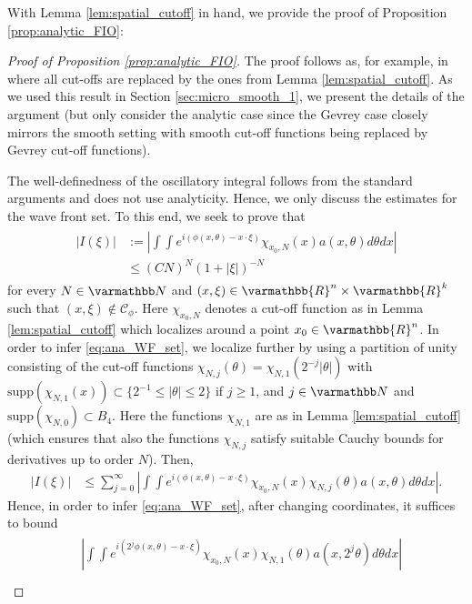 \documentclass[12pt,twoside]{amsart}
\numberwithin{equation}{section}
\renewcommand{\leq}{\leqslant}
\renewcommand{\geq}{\geqslant}
\renewcommand{\mathbb}{\varmathbb}
\newcommand {\R} {\mathbb{R}} \newcommand {\Z} {\mathbb{Z}}
\newcommand{\supp}{\mathrm{supp}}
\begin{document}
\begin{appendix}
With Lemma \ref{lem:spatial_cutoff} in hand, we provide the proof of Proposition \ref{prop:analytic_FIO}:

\begin{proof}[Proof of Proposition \ref{prop:analytic_FIO}]
The proof follows as, for example, in \cite[Theorem 0.5.1]{Sogge} where all cut-offs are replaced by the ones from Lemma \ref{lem:spatial_cutoff}. As we used this result in Section \ref{sec:micro_smooth_1}, we present the details of the argument (but only consider the analytic case since the Gevrey case closely mirrors the smooth setting with smooth cut-off functions being replaced by Gevrey cut-off functions).

The well-definedness of the oscillatory integral follows from the standard arguments and does not use analyticity. Hence, we only discuss the estimates for the wave front set. To this end, we seek to prove that
\begin{align}
\label{eq:ana_WF_set}
\begin{split}
|I(\xi)| 
&:= \left|\int\int e^{i(\phi(x,\theta)- x\cdot \xi)} \chi_{x_0,N}(x) a(x,\theta) d\theta dx \right| \\
&\leq (C N)^N (1+|\xi|)^{-N}
\end{split}
\end{align}
for every $N\in \N$ and $(x,\xi) \in \R^n \times \R^k$ such that $(x,\xi) \notin \mathcal{C}_{\phi}$. Here $\chi_{x_0,N}$ denotes a cut-off function as in Lemma \ref{lem:spatial_cutoff} which localizes around a point $x_0 \in \R^n$. In order to infer \eqref{eq:ana_WF_set}, we localize further by using a partition of unity consisting of the cut-off functions $\chi_{N,j}(\theta) = \chi_{N,1}(2^{-j}|\theta|)$ with $\supp(\chi_{N,1}(x)) \subset \{2^{-1}\leq |\theta| \leq 2\}$ if $j\geq 1$, and $j\in \N$ and $\supp(\chi_{N,0}) \subset B_{4}$. Here the functions $\chi_{N,1}$ are as in Lemma \ref{lem:spatial_cutoff} (which ensures that also the functions $\chi_{N,j}$ satisfy suitable Cauchy bounds for derivatives up to order $N$).
Then, 
\begin{align*}
|I(\xi)|
& \leq \sum\limits_{j=0}^{\infty} \left| \int\int e^{i(\phi(x,\theta)-x\cdot \xi)} \chi_{x_0,N}(x)\chi_{N,j}(\theta)a(x,\theta) d\theta dx \right|.
\end{align*}
Hence, in order to infer \eqref{eq:ana_WF_set}, after changing coordinates, it suffices to bound
\begin{align}
\label{eq:stationary_phase_est}
\begin{split}
&\left| \int\int e^{i(2^j\phi(x,\theta)-x\cdot \xi)} \chi_{x_0,N}(x)\chi_{N,1}(\theta) a(x, 2^j\theta) d\theta dx \right|\\

\end{split}
\end{align}
\end{proof}
\end{appendix}
\end{document}
